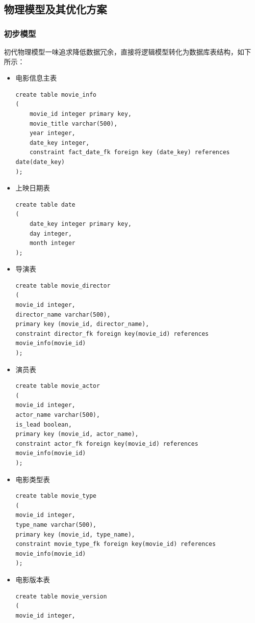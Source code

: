 \documentclass{ctexrep}
\begin{document}
	\subsection{物理模型及其优化方案}
	\subsubsection{初步模型} \label{mysql:1}
	初代物理模型一味追求降低数据冗余，直接将逻辑模型转化为数据库表结构，如下所示：
	\begin{itemize}
	    \item 电影信息主表
	        \begin{lstlisting}
create table movie_info
(
    movie_id integer primary key,
    movie_title varchar(500),
    year integer,
    date_key integer,
    constraint fact_date_fk foreign key (date_key) references date(date_key)
);
	        \end{lstlisting}
	    \item 上映日期表
	        \begin{lstlisting}
create table date
(
    date_key integer primary key,
    day integer,
    month integer
);
            \end{lstlisting}
        \item 导演表
            \begin{lstlisting}
create table movie_director
(
movie_id integer,
director_name varchar(500),
primary key (movie_id, director_name),
constraint director_fk foreign key(movie_id) references movie_info(movie_id)
);
            \end{lstlisting}
        \item 演员表
            \begin{lstlisting}
create table movie_actor
(
movie_id integer,
actor_name varchar(500),
is_lead boolean,
primary key (movie_id, actor_name),
constraint actor_fk foreign key(movie_id) references movie_info(movie_id)
);
            \end{lstlisting}
        \item 电影类型表
            \begin{lstlisting}
create table movie_type
(
movie_id integer,
type_name varchar(500),
primary key (movie_id, type_name),
constraint movie_type_fk foreign key(movie_id) references movie_info(movie_id)
);
            \end{lstlisting}
        \item 电影版本表
            \begin{lstlisting}
create table movie_version
(
movie_id integer,

\end{lstlisting}
\end{itemize}
\end{document}

